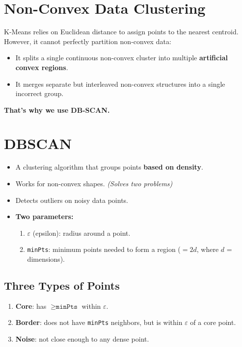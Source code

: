 \documentclass[12pt,a4paper]{article}
\begin{document}
\section{Non-Convex Data Clustering}

K-Means relies on Euclidean distance to assign points to the nearest centroid. However, it cannot perfectly partition non-convex data:
\begin{itemize}
  \item It splits a single continuous non-convex cluster into multiple \textbf{artificial convex regions}.
  \item It merges separate but interleaved non-convex structures into a single incorrect group.
\end{itemize}

\textbf{That's why we use DB-SCAN.}

\section{DBSCAN}

\begin{definitionbox}
\begin{itemize}
  \item A clustering algorithm that groups points \textbf{based on density}.
  \item Works for non-convex shapes. \hfill \textit{(Solves two problems)}
  \item Detects outliers on noisy data points.
  \item \textbf{Two parameters:}
        \begin{enumerate}
          \item $\varepsilon$ (epsilon): radius around a point.
          \item \texttt{minPts}: minimum points needed to form a region ($= 2d$, where $d$ = dimensions).
        \end{enumerate}
\end{itemize}
\end{definitionbox}

\subsection{Three Types of Points}
\begin{enumerate}
  \item \textbf{Core}: has $\geq \texttt{minPts}$ within $\varepsilon$.
  \item \textbf{Border}: does not have \texttt{minPts} neighbors, but is within $\varepsilon$ of a core point.
  \item \textbf{Noise}: not close enough to any dense point.
\end{enumerate}
\end{document}
